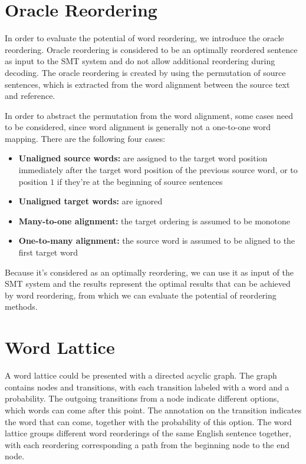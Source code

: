 \section{Oracle Reordering}
\label{ch:Foundations:sec:oracle}

In order to evaluate the potential of word reordering, we introduce the oracle reordering. Oracle reordering is considered to be an optimally reordered sentence as input to the \ac{SMT} system and do not allow additional reordering during decoding. \citep{combine} The oracle reordering is created by using the permutation of source sentences, which is extracted from the word alignment between the source text and reference.

In order to abstract the permutation from the word alignment, some cases need to be considered, since word alignment is generally not a one-to-one word mapping. There are the following four cases: \citep{birch2}

\begin{itemize}
\setlength{\itemsep}{0cm}%
\setlength{\parskip}{0cm}%
\item \textbf{Unaligned source words:} are assigned to the target word position immediately after the target word position of the previous source word, or to position $1$ if they're at the beginning of source sentences
\item \textbf{Unaligned target words:} are ignored
\item \textbf{Many-to-one alignment:} the target ordering is assumed to be monotone
\item \textbf{One-to-many alignment:} the source word is assumed to be aligned to the first target word
\end{itemize}

Because it's considered as an optimally reordering, we can use it as input of the \ac{SMT} system and the results represent the optimal results that can be achieved by word reordering, from which we can evaluate the potential of reordering methods.

\section{Word Lattice}
\label{ch:Foundations:sec:Lattices}
\label{latticecreation}
A word lattice could be presented with a directed acyclic graph. The graph contains nodes and transitions, with each transition labeled with a word and a probability. The outgoing transitions from a node indicate different options, which words can come after this point. The annotation on the transition indicates the word that can come, together with the probability of this option. The word lattice groups different word reorderings of the same English sentence together, with each reordering corresponding a path from the beginning node to the end node. 

